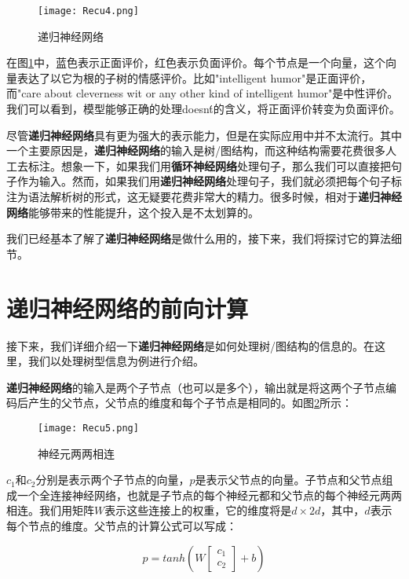 \begin{figure}[!h]
	\centering
	\texttt{[image: Recu4.png]}
	\caption{递归神经网络}
	\label{fig:Recu4}
\end{figure}

在图\ref{fig:Recu4}中，蓝色表示正面评价，红色表示负面评价。每个节点是一个向量，这个向量表达了以它为根的子树的情感评价。比如"intelligent humor"是正面评价，而"care about cleverness wit or any other kind of intelligent humor"是中性评价。我们可以看到，模型能够正确的处理doesn\'t的含义，将正面评价转变为负面评价。

尽管\textbf{递归神经网络}具有更为强大的表示能力，但是在实际应用中并不太流行。其中一个主要原因是，\textbf{递归神经网络}的输入是树/图结构，而这种结构需要花费很多人工去标注。想象一下，如果我们用\textbf{循环神经网络}处理句子，那么我们可以直接把句子作为输入。然而，如果我们用\textbf{递归神经网络}处理句子，我们就必须把每个句子标注为语法解析树的形式，这无疑要花费非常大的精力。很多时候，相对于\textbf{递归神经网络}能够带来的性能提升，这个投入是不太划算的。

我们已经基本了解了\textbf{递归神经网络}是做什么用的，接下来，我们将探讨它的算法细节。

\section{递归神经网络的前向计算}\label{Recu:2}

接下来，我们详细介绍一下\textbf{递归神经网络}是如何处理树/图结构的信息的。在这里，我们以处理树型信息为例进行介绍。

\textbf{递归神经网络}的输入是两个子节点（也可以是多个），输出就是将这两个子节点编码后产生的父节点，父节点的维度和每个子节点是相同的。如图\ref{fig:Recu5}所示：

\begin{figure}[!h]
	\centering
	\texttt{[image: Recu5.png]}
	\caption{神经元两两相连}
	\label{fig:Recu5}
\end{figure}

\({c}_1\)和\({c}_2\)分别是表示两个子节点的向量，\({p}\)是表示父节点的向量。子节点和父节点组成一个全连接神经网络，也就是子节点的每个神经元都和父节点的每个神经元两两相连。我们用矩阵\(W\)表示这些连接上的权重，它的维度将是\(d\times 2d\)，其中，\(d\)表示每个节点的维度。父节点的计算公式可以写成：

\begin{equation}
	\label{eq:Recu1}
	{p} = tanh(W\begin{bmatrix}{c}_1\\{c}_2\end{bmatrix}+{b})
\end{equation}


